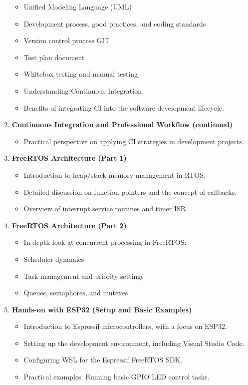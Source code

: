\begin{enumerate}[label=\textbf{Week \arabic*:}]
\begin{itemize}
  \item Unified Modeling Language (UML)
  \item Development process, good practices, and coding standards
  \item Version control process GIT
  \item Test plan document
  \item Whitebox testing and manual testing
  \item Understanding Continuous Integration
  \item Benefits of integrating CI into the software development lifecycle.
\end{itemize}
\item \textbf{ Continuous Integration and Professional Workflow (continued) }
\begin{itemize}
  \item Practical perspective on applying CI strategies in development projects.
\end{itemize}
\item \textbf{ FreeRTOS Architecture (Part 1) }
\begin{itemize}
  \item Introduction to heap/stack memory management in RTOS.
  \item Detailed discussion on function pointers and the concept of callbacks.
  \item Overview of interrupt service routines and timer ISR.
\end{itemize}
\item \textbf{ FreeRTOS Architecture (Part 2) }
\begin{itemize}
  \item In-depth look at concurrent processing in FreeRTOS:
  \item Scheduler dynamics
  \item Task management and priority settings
  \item Queues, semaphores, and mutexes
\end{itemize}
\item \textbf{ Hands-on with ESP32 (Setup and Basic Examples) }
\begin{itemize}
  \item Introduction to Espressif microcontrollers, with a focus on ESP32.
  \item Setting up the development environment, including Visual Studio Code.
  \item Configuring WSL for the Espressif FreeRTOS SDK.
  \item Practical examples: Running basic GPIO LED control tasks.

\end{itemize}
\end{enumerate}
